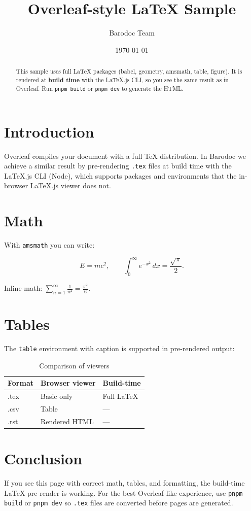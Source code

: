 \documentclass[11pt,a4paper]{article}
\title{Overleaf-style LaTeX Sample}
\author{Barodoc Team}
\date{\today}
\begin{document}
\maketitle

\begin{abstract}
This sample uses full LaTeX packages (babel, geometry, amsmath, table, figure). It is rendered at \textbf{build time} with the LaTeX.js CLI, so you see the same result as in Overleaf. Run \texttt{pnpm build} or \texttt{pnpm dev} to generate the HTML.
\end{abstract}

\section{Introduction}

Overleaf compiles your document with a full TeX distribution. In Barodoc we achieve a similar result by pre-rendering \texttt{.tex} files at build time with the LaTeX.js CLI (Node), which supports packages and environments that the in-browser LaTeX.js viewer does not.

\section{Math}

With \texttt{amsmath} you can write:

\begin{equation}
  E = mc^2, \qquad
  \int_0^\infty e^{-x^2}\,dx = \frac{\sqrt{\pi}}{2}.
\end{equation}

Inline math: \(\sum_{n=1}^\infty \frac{1}{n^2} = \frac{\pi^2}{6}\).

\section{Tables}

The \texttt{table} environment with caption is supported in pre-rendered output:

\begin{table}[htbp]
  \centering
  \caption{Comparison of viewers}
  \begin{tabular}{lll}
    \toprule
    Format & Browser viewer & Build-time \\
    \midrule
    .tex   & Basic only     & Full LaTeX \\
    .csv   & Table          & --- \\
    .rst   & Rendered HTML  & --- \\
    \bottomrule
  \end{tabular}
\end{table}

\section{Conclusion}

If you see this page with correct math, tables, and formatting, the build-time LaTeX pre-render is working. For the best Overleaf-like experience, use \texttt{pnpm build} or \texttt{pnpm dev} so \texttt{.tex} files are converted before pages are generated.
\end{document}
